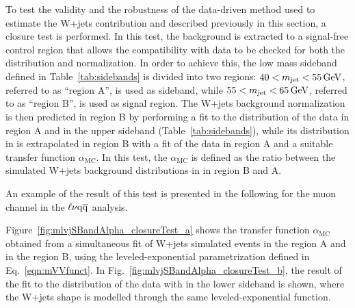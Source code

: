To test the validity and the robustness of the data-driven method used to estimate the W+jets contribution and described previously in this section, a closure test is performed.
In this test, the background is extracted to a signal-free control region that allows the compatibility with data to be checked for both the distribution and normalization.
In order to achieve this, the low mass sideband defined in Table~\ref{tab:sidebands} is divided into two regions:
$40 < m_{\text{jet}} < 55\,\text{Ge\hspace{-.08em}V}$, referred to as ``region A'', is used as sideband, while $55 < m_{\text{jet}} < 65\,\text{Ge\hspace{-.08em}V}$, referred to as ``region B'', is used as signal region.
The W+jets background normalization is then predicted in region B by performing a fit to the \mJ distribution of the data in region A and in the upper sideband (Table~\ref{tab:sidebands}),
while its distribution in \mlvj is extrapolated in region B with a fit of the data in region A and a suitable transfer function $\alpha_\mathrm{MC}$.
In this test, the $\alpha_\mathrm{MC}$ is defined as the ratio between the simulated W+jets background distributions in \mlvj in region B and A.

An example of the result of this test is presented in the following for the muon channel in the $\ell\nu\mathrm{q}\overline{\mathrm{q}}$ analysis.
%

Figure~\ref{fig:mlvjSBandAlpha_closureTest_a} shows the transfer function $\alpha_\mathrm{MC}$ obtained from a simultaneous fit of W+jets simulated events in the region A and in the region B, using the leveled-exponential parametrization defined in Eq.~\ref{eqn:mVVfunct}. In Fig.~\ref{fig:mlvjSBandAlpha_closureTest_b}, the result of the fit to the \mlvj distribution of the data with \mJ in the lower sideband is shown, where the W+jets shape is modelled through the same leveled-exponential function.

